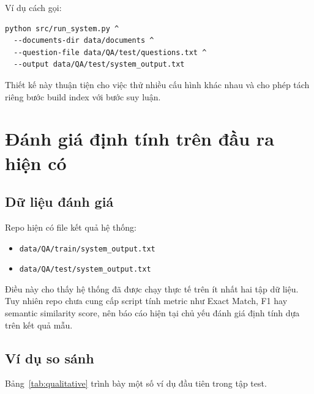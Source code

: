 \documentclass[12pt,a4paper]{article}
\begin{document}
Ví dụ cách gọi:

\begin{lstlisting}[style=pythonstyle]
python src/run_system.py ^
  --documents-dir data/documents ^
  --question-file data/QA/test/questions.txt ^
  --output data/QA/test/system_output.txt
\end{lstlisting}

Thiết kế này thuận tiện cho việc thử nhiều cấu hình khác nhau và cho phép tách riêng bước build index với bước suy luận.

\section{Đánh giá định tính trên đầu ra hiện có}

\subsection{Dữ liệu đánh giá}

Repo hiện có file kết quả hệ thống:
\begin{itemize}[leftmargin=1.5cm]
    \item \texttt{data/QA/train/system\_output.txt}
    \item \texttt{data/QA/test/system\_output.txt}
\end{itemize}

Điều này cho thấy hệ thống đã được chạy thực tế trên ít nhất hai tập dữ liệu. Tuy nhiên repo chưa cung cấp script tính metric như Exact Match, F1 hay semantic similarity score, nên báo cáo hiện tại chủ yếu đánh giá định tính dựa trên kết quả mẫu.

\subsection{Ví dụ so sánh}

Bảng~\ref{tab:qualitative} trình bày một số ví dụ đầu tiên trong tập test.
\end{document}
